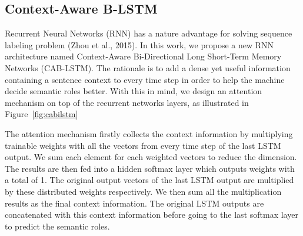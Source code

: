 \subsection{Context-Aware B-LSTM}
Recurrent Neural Networks (RNN) has a nature advantage for solving sequence labeling problem (Zhou et al., 2015). In this work, we propose a new RNN architecture named Context-Aware Bi-Directional Long Short-Term Memory Networks (CAB-LSTM). The rationale is to add a dense yet useful information containing a sentence context to every time step in order to help the machine decide semantic roles better. With this in mind, we design an attention mechanism on top of the recurrent networks layers, as illustrated in Figure~\ref{fig:cabilstm} 

The attention mechanism firstly collects the context information by multiplying trainable weights with all the vectors from every time step of the last LSTM output. We sum each element for each weighted vectors to reduce the dimension. The results are then fed into a hidden softmax layer which outputs weights with a total of 1. The original output vectors of the last LSTM output are multiplied by these distributed weights respectively. We then sum all the multiplication results as the final context information. The original LSTM outputs are concatenated with this context information before going to the last softmax layer to predict the semantic roles. 

